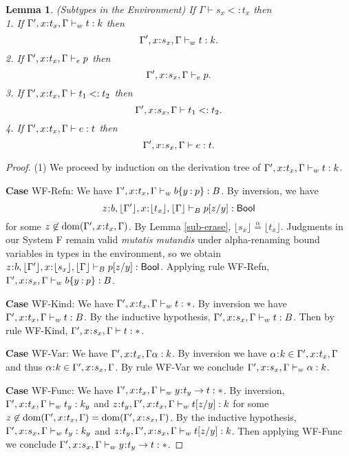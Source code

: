 \documentclass[11pt]{article}
\newtheorem{lemma}[theorem]{Lemma}
\newcommand{\al}{\alpha}
\newcommand{\bind}{\hspace{0.05em}{:}\hspace{0.05em}} %
\newcommand{\col}{\mathbin{:}}       %
\newcommand{\Bool}{{\sf Bool}}
\newcommand{\functype}[3]{#1\bind #2 \rightarrow #3}
\newcommand{\dom}[1]{{\rm dom}(#1)}
\begin{document}
\begin{lemma}\label{subtype-env}
(Subtypes in the Environment) If $\Gamma \vdash s_x <: t_x$ then \\
1. If $\Gamma', x\bind t_x, \Gamma \vdash_w t : k$ then
\[
\Gamma', x\bind s_x, \Gamma \vdash_w t : k.
\]
2. If $\Gamma', x\bind t_x, \Gamma \vdash_e p$ then 
\[
\Gamma', x\bind s_x, \Gamma \vdash_e p. 
\]
3. If $\Gamma', x\bind t_x, \Gamma \vdash t_1 <: t_2$ then
\[
\Gamma', x\bind s_x, \Gamma \vdash t_1 <: t_2.
\]
4. If $\Gamma', x\bind t_x, \Gamma \vdash e : t$ then
\[
\Gamma', x\bind s_x, \Gamma \vdash e : t.
\]
\end{lemma}
\begin{proof}
(1) We proceed by induction on the derivation tree of $\Gamma', x\bind t_x, \Gamma \vdash_w t : k$.

{\bf Case} {\sc WF-Refn}: We have $\Gamma', x\bind t_x, \Gamma \vdash_w b\{y\col p\} : B$. By inversion, we have 
\begin{equation}
z\bind b, \lfloor \Gamma'\rfloor, x\bind \lfloor t_x\rfloor, \lfloor\Gamma\rfloor \vdash_B p[z/y] : \Bool
\end{equation}
for some $z\not\in\dom{\Gamma', x\bind t_x, \Gamma}$. By Lemma \ref{sub-erase}, $\lfloor s_x\rfloor \overset{\al}{=} \lfloor t_x\rfloor$. Judgments in our System F remain valid {\em mutatis mutandis} under alpha-renaming bound variables in types in the environment, so we obtain $z\bind b, \lfloor \Gamma'\rfloor, x\bind \lfloor s_x\rfloor, \lfloor\Gamma\rfloor \vdash_B p[z/y] : \Bool$. Applying rule {\sc WF-Refn}, $\Gamma', x\bind s_x, \Gamma \vdash_w b\{y\col p\} : B$.

{\bf Case} {\sc WF-Kind}: We have $\Gamma', x\bind t_x, \Gamma \vdash_w t : *$. By inversion we have $\Gamma', x\bind t_x, \Gamma \vdash_w t : B$. By the inductive hypothesis, $\Gamma', x\bind s_x, \Gamma \vdash_w t : B$. Then by rule {\sc WF-Kind}, $\Gamma', x\bind s_x, \Gamma \vdash t: *$.

{\bf Case} {\sc WF-Var}: We have $\Gamma', x\bind t_x, \Gamma \al : k$. By inversion we have $\al\bind k \in \Gamma', x\bind t_x, \Gamma$ and thus $\al\bind k \in \Gamma', x\bind s_x, \Gamma$. By rule {\sc WF-Var} we conclude $\Gamma', x\bind s_x, \Gamma \vdash_w \al : k$.

{\bf Case} {\sc WF-Func}: We have $\Gamma', x\bind t_x, \Gamma \vdash_w \functype{y}{t_y}{t} : *$. By inversion, $\Gamma', x\bind t_x, \Gamma \vdash_w t_y : k_y$ and $z\bind t_y, \Gamma', x\bind t_x, \Gamma \vdash_w t[z/y] : k$ for some $z\not\in\dom{\Gamma', x\bind t_x, \Gamma} = \dom{\Gamma', x\bind s_x, \Gamma}$. By the inductive hypothesis, $\Gamma', x\bind s_x, \Gamma \vdash_w t_y : k_y$ and $z\bind t_y, \Gamma', x\bind s_x, \Gamma \vdash_w t[z/y] : k$. Then applying {\sc WF-Func} we conclude $\Gamma', x\bind s_x, \Gamma \vdash_w \functype{y}{t_y}{t} : *$.


\end{proof}
\end{document}
